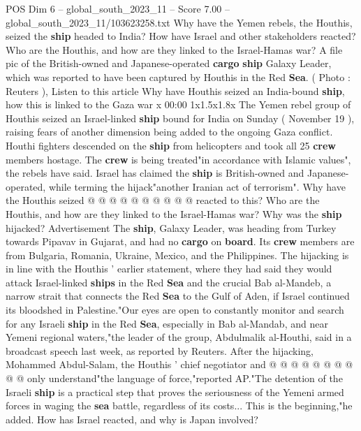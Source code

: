 \begin{textsample}{POS Dim 6 – global\_south\_2023\_11 – Score 7.00 – global\_south\_2023\_11/103623258.txt}  \label{ex:f6_pos_303}
Why have the Yemen rebels, the Houthis, seized the \textbf{ship} headed to India?
How have Israel and other stakeholders reacted?
Who are the Houthis, and how are they linked to the Israel-Hamas war?
A file pic of the British-owned and Japanese-operated \textbf{cargo} \textbf{ship} Galaxy Leader, which was reported to have been captured by Houthis in the Red \textbf{Sea}. ( Photo : Reuters ), Listen to this article Why have Houthis seized an India-bound \textbf{ship}, how this is linked to the Gaza war x 00:00 1x1.5x1.8x The Yemen rebel group of Houthis seized an Israel-linked \textbf{ship} bound for India on Sunday ( November 19 ), raising fears of another dimension being added to the ongoing Gaza conflict.
Houthi fighters descended on the \textbf{ship} from helicopters and took all 25 \textbf{crew} members hostage.
The \textbf{crew} is being treated"in accordance with Islamic values", the rebels have said.
Israel has claimed the \textbf{ship} is British-owned and Japanese-operated, while terming the hijack"another Iranian act of terrorism".
Why have the Houthis seized @ @ @ @ @ @ @ @ @ @ reacted to this?
Who are the Houthis, and how are they linked to the Israel-Hamas war?
Why was the \textbf{ship} hijacked?
Advertisement The \textbf{ship}, Galaxy Leader, was heading from Turkey towards Pipavav in Gujarat, and had no \textbf{cargo} on \textbf{board}.
Its \textbf{crew} members are from Bulgaria, Romania, Ukraine, Mexico, and the Philippines.
The hijacking is in line with the Houthis ' earlier statement, where they had said they would attack Israel-linked \textbf{ships} in the Red \textbf{Sea} and the crucial Bab al-Mandeb, a narrow strait that connects the Red \textbf{Sea} to the Gulf of Aden, if Israel continued its bloodshed in Palestine."Our eyes are open to constantly monitor and search for any Israeli \textbf{ship} in the Red \textbf{Sea}, especially in Bab al-Mandab, and near Yemeni regional waters,"the leader of the group, Abdulmalik al-Houthi, said in a broadcast speech last week, as reported by Reuters.
After the hijacking, Mohammed Abdul-Salam, the Houthis ' chief negotiator and @ @ @ @ @ @ @ @ @ @ only understand"the language of force,"reported AP."The detention of the Israeli \textbf{ship} is a practical step that proves the seriousness of the Yemeni armed forces in waging the \textbf{sea} battle, regardless of its costs...
This is the beginning,"he added.
How has Israel reacted, and why is Japan involved?

\end{textsample}
